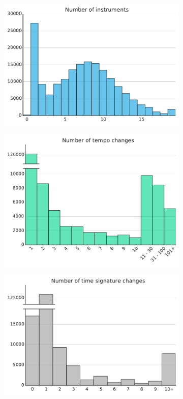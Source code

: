 \documentclass{article}
\begin{document}
\begin{figure}
    \centering
    \begin{subfigure}{.23\textwidth}
        \includegraphics[width=\textwidth]{n_instruments.pdf}
    \end{subfigure}
    \begin{subfigure}{.23\textwidth}
        \includegraphics[width=\textwidth]{n_tempos.pdf}
    \end{subfigure}
    \begin{subfigure}{.23\textwidth}
        \includegraphics[width=\textwidth]{n_signatures.pdf}

\end{subfigure}
\end{figure}
\end{document}
